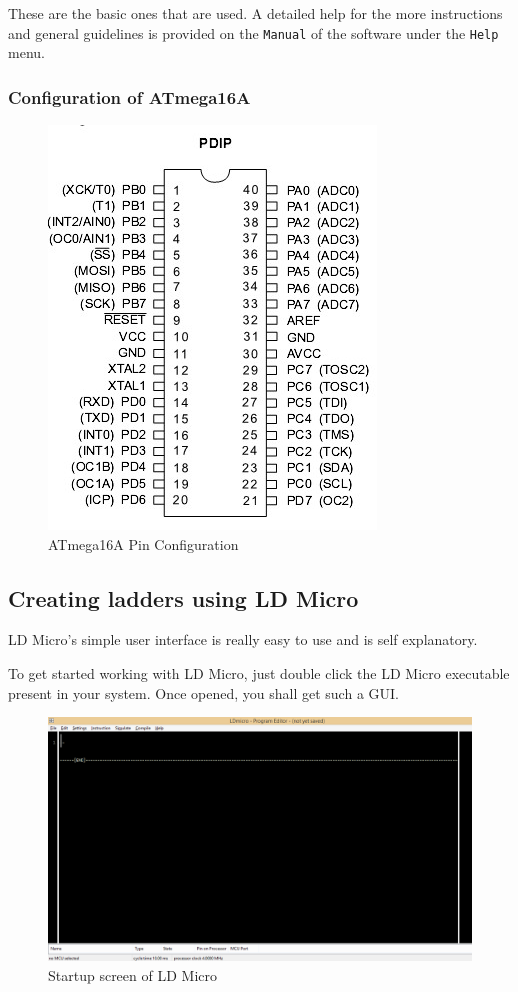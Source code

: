 \documentclass[12pt]{article}
\begin{document}
\begin{enumerate}
These are the basic ones that are used. A detailed help for the more instructions and general guidelines is provided on the \texttt{Manual} of the software under the \texttt{Help} menu.
\end{enumerate} 
\newpage
{\large \subsubsection{Configuration of ATmega16A}}
\begin{figure}[h!]
\centering
\includegraphics[scale=0.7]{atmega16.png}
\caption{ATmega16A Pin Configuration}
\end{figure}
\newpage
{\large \subsection{Creating ladders using LD Micro}}
LD Micro's simple user interface is really easy to use and is self explanatory.

To get started working with LD Micro, just double click the LD Micro executable present in your system.\vspace{12pt}
Once opened, you shall get such a GUI.\vspace{12pt}
\begin{figure}[h!]
\centering
\includegraphics[scale=0.4]{ld1.png}
\caption{Startup screen of LD Micro}
\end{figure}
\end{document}
